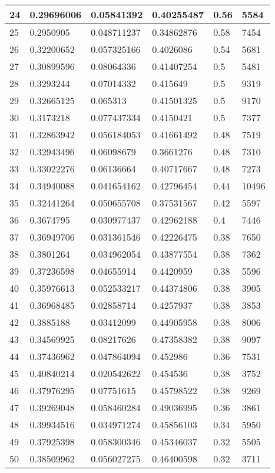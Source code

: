 \begin{longtable}{|l|l|l|l|l|l|}
24 & 0.29696006 & 0.05841392 & 0.40255487 & 0.56 & 5584 \\ \hline 
25 & 0.2950905 & 0.048711237 & 0.34862876 & 0.58 & 7454 \\ \hline 
26 & 0.32200652 & 0.057325166 & 0.4026086 & 0.54 & 5681 \\ \hline 
27 & 0.30899596 & 0.08064336 & 0.41407254 & 0.5 & 5481 \\ \hline 
28 & 0.3293244 & 0.07014332 & 0.415649 & 0.5 & 9319 \\ \hline 
29 & 0.32665125 & 0.065313 & 0.41501325 & 0.5 & 9170 \\ \hline 
30 & 0.3173218 & 0.077437334 & 0.4150421 & 0.5 & 7377 \\ \hline 
31 & 0.32863942 & 0.056184053 & 0.41661492 & 0.48 & 7519 \\ \hline 
32 & 0.32943496 & 0.06098679 & 0.3661276 & 0.48 & 7310 \\ \hline 
33 & 0.33022276 & 0.06136664 & 0.40717667 & 0.48 & 7273 \\ \hline 
34 & 0.34940088 & 0.041654162 & 0.42796454 & 0.44 & 10496 \\ \hline 
35 & 0.32441264 & 0.050655708 & 0.37531567 & 0.42 & 5597 \\ \hline 
36 & 0.3674795 & 0.030977437 & 0.42962188 & 0.4 & 7446 \\ \hline 
37 & 0.36949706 & 0.031361546 & 0.42226475 & 0.38 & 7650 \\ \hline 
38 & 0.3801264 & 0.034962054 & 0.43877554 & 0.38 & 7362 \\ \hline 
39 & 0.37236598 & 0.04655914 & 0.4420959 & 0.38 & 5596 \\ \hline 
40 & 0.35976613 & 0.052533217 & 0.44374806 & 0.38 & 3905 \\ \hline 
41 & 0.36968485 & 0.02858714 & 0.4257937 & 0.38 & 3853 \\ \hline 
42 & 0.3885188 & 0.03412099 & 0.44905958 & 0.38 & 8006 \\ \hline 
43 & 0.34569925 & 0.08217626 & 0.47358382 & 0.38 & 9097 \\ \hline 
44 & 0.37436962 & 0.047864094 & 0.452986 & 0.36 & 7531 \\ \hline 
45 & 0.40840214 & 0.020542622 & 0.454536 & 0.38 & 3752 \\ \hline 
46 & 0.37976295 & 0.07751615 & 0.45798522 & 0.38 & 9269 \\ \hline 
47 & 0.39269048 & 0.058460284 & 0.49036995 & 0.36 & 3861 \\ \hline 
48 & 0.39934516 & 0.034971274 & 0.45856103 & 0.34 & 5950 \\ \hline 
49 & 0.37925398 & 0.058300346 & 0.45346037 & 0.32 & 5505 \\ \hline 
50 & 0.38509962 & 0.056027275 & 0.46400598 & 0.32 & 3711 \\ \hline 
\end{longtable}
